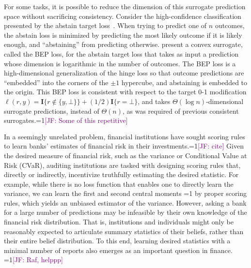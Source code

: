 \documentclass[anon,12pt]{colt2021} %
\newcommand{\Comments}{1}
\newcommand{\mynote}[2]{\ifnum\Comments=1\textcolor{#1}{#2}\fi}
\newcommand{\mytodo}[2]{\ifnum\Comments=1%
	\todo[linecolor=#1!80!black,backgroundcolor=#1,bordercolor=#1!80!black]{#2}\fi}
\newcommand{\jessie}[1]{\mynote{purple}{[JF: #1]}}
\newcommand{\jessiet}[1]{\mytodo{purple!20!white}{JF: #1}}
\newcommand{\Ind}[1]{\mathbf{I}\{{#1}\}}
\begin{document}
For some tasks, it is possible to reduce the dimension of this surrogate prediction space without sacrificing consistency.  
Consider the high-confidence classification presented by the abstain target loss~\citep{ramaswamy2012classification,ramaswamy2018consistent}.
When trying to predict one of $n$ outcomes, the abstain loss is minimized by predicting the most likely outcome if it is likely enough, and ``abstaining'' from predicting otherwise.
\citet{ramaswamy2016convex} present a convex surrogate, called the BEP loss, for the abstain target loss that takes as input a prediction whose dimension is logarithmic in the number of outcomes.
The BEP loss is a high-dimensional generalization of the hinge loss so that outcome predictions are ``embedded'' into the corners of the $\pm 1$ hypercube, and abstaining is embedded to the origin.
This BEP loss is consistent with respect to the target 0-1 modification $\ell(r,y) = \Ind{r \not \in \{y,\bot\}} + (1/2) \Ind{r = \bot}$, and takes $\Theta(\log n)$-dimensional surrogate predictions, instead of $\Theta(n)$, as was required of previous consistent surrogates.\jessie{Some of this repetitive}


In a seemingly unrelated problem, financial institutions have sought scoring rules to learn banks' estimates of financial risk in their investments.\jessie{cite}
Given the desired measure of financial risk, such as the variance or Conditional Value at Risk (CVaR), auditing institutions are tasked with designing scoring rules that, directly or indirectly, incentivize truthfully estimating the desired statistic.
For example, while there is no loss function that enables one to directly learn the variance, we can learn the first and second central moments \jessiet{how much detail to share?} by proper scoring rules, which yields an unbiased estimator of the variance.
However, asking a bank for a large number of predictions may be infeasible by their own knowledge of the financial risk distribution.
That is, institutions and individuals might only be reasonably expected to articulate summary statistics of their beliefs, rather than their entire belief distribution.
To this end, learning desired statistics with a minimal number of reports also emerges as an important question in finance.
\jessie{Raf, helppp}
\end{document}
